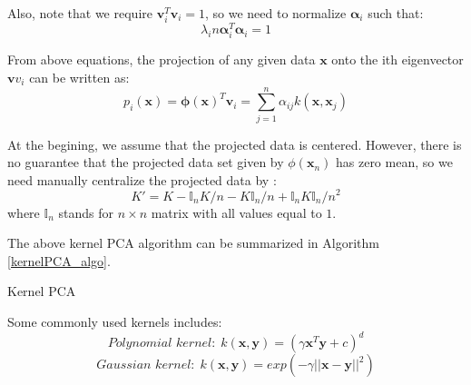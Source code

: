 \documentclass[tikz, multi,dvipsnames,svgnames,x11names]{article}
\makeatletter
\def\BState{\State\hskip-\ALG@thistlm}
\makeatother
\begin{document}
Also, note that we require $\bm{v}_i^T \bm{v}_i = 1$, so we need to normalize $\bm{\alpha}_i$ such that:
\begin{equation}
\label{eq10}
\lambda_i n \bm{\alpha}_i^T \bm{\alpha}_i = 1
\end{equation}

From above equations, the projection of any given data $\bm{x}$ onto the ith eigenvector $\bm{v}v_i$ can be written as:
\begin{equation}
\label{eq11}
p_i(\bm x) = \bm{\phi(x)}^T \bm{v}_i = \sum_{j=1}^n \alpha_{ij} k(\bm{x}, \bm{x}_j)
\end{equation}

At the begining, we assume that the projected data is centered. However, there is no guarantee that the projected data set given by $\phi(\bm{x}_n)$ has zero mean, so we need manually centralize the projected data by \cite{bishop2007pattern}:
\begin{equation}
\label{eq12}
K' = K - \mathbb{I}_nK/n - K\mathbb{I}_n/n + \mathbb{I}_nK\mathbb{I}_n/n^2
\end{equation}
where $\mathbb{I}_n$ stands for $n \times n$ matrix with all values equal to $1$.

The above kernel PCA algorithm can be summarized in Algorithm \ref{kernelPCA_algo}.

\begin{algorithm}[htb]
\caption{Kernel PCA}
\label{kernelPCA_algo}
\end{algorithm}

Some commonly used kernels includes:
\begin{equation}
\label{eq13}
\textit{Polynomial kernel:} \ \  k(\bm{x}, \bm{y}) = (\gamma \bm{x}^T \bm{y} + c)^d
\end{equation}
\begin{equation}
\label{eq14}
\textit{Gaussian kernel:} \ \  k(\bm{x}, \bm{y}) = exp(-\gamma ||\bm{x} - \bm{y}||^2)
\end{equation}
\end{document}
